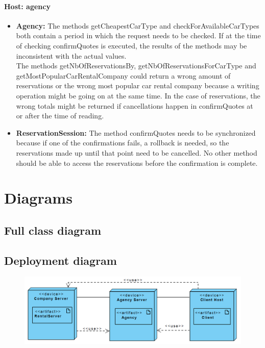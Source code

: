 \documentclass[10pt,a4paper]{article}
\begin{document}

\paragraph{Host: agency}
\begin{itemize}
\item \textbf{Agency:} The methods getCheapestCarType and checkForAvailableCarTypes both contain a period in which the request needs to be checked. If at the time of checking confirmQuotes is executed, the results of the methods may be inconsistent with the actual values.\\ 
The methods getNbOfReservationsBy, getNbOfReservationsForCarType and getMostPopularCarRentalCompany could return a wrong amount of reservations or the wrong most popular car rental company because a writing operation might be going on at the same time. In the case of reservations, the wrong totals might be returned if cancellations happen in confirmQuotes at or after the time of reading.
\item \textbf{ReservationSession:} The method confirmQuotes needs to be synchronized because if one of the confirmations fails, a rollback is needed, so the reservations made up until that point need to be cancelled. No other method should be able to access the reservations before the confirmation is complete.
\end{itemize}

\section{Diagrams}

\subsection{Full class diagram}
 
\clearpage

\subsection{Deployment diagram}
\begin{figure}[ht!]
\centering
\includegraphics[width=160mm]{DeploymentDiagram.png}
\label{deploymentdiagram}
\end{figure}
\end{document}
